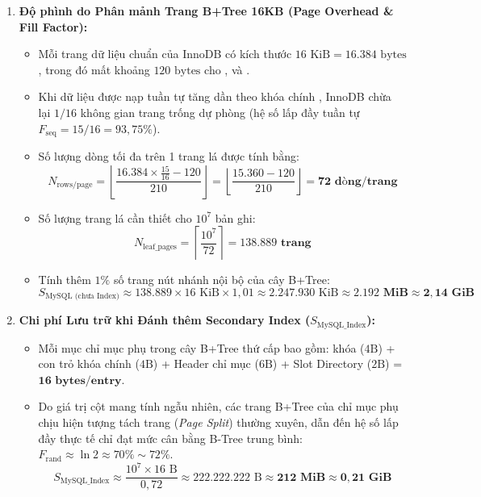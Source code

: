 \begin{enumerate}
  \item \textbf{Độ phình do Phân mảnh Trang B+Tree 16KB (Page Overhead \& Fill Factor):}
  \begin{itemize}
    \item Mỗi trang dữ liệu chuẩn của InnoDB có kích thước $16\text{ KiB} = 16.384\text{ bytes}$, trong đó mất khoảng $120\text{ bytes}$ cho ,  và .
    \item Khi dữ liệu được nạp tuần tự tăng dần theo khóa chính , InnoDB chừa lại $1/16$ không gian trang trống dự phòng (hệ số lấp đầy tuần tự $F_{\text{seq}} = 15/16 = 93,75\%$).
    \item Số lượng dòng tối đa trên 1 trang lá được tính bằng:
    \begin{equation}
      N_{\text{rows/page}} = \left\lfloor \frac{16.384 \times \frac{15}{16} - 120}{210} \right\rfloor = \left\lfloor \frac{15.360 - 120}{210} \right\rfloor = \mathbf{72\text{ dòng/trang}}
    \end{equation}
    \item Số lượng trang lá cần thiết cho $10^7$ bản ghi:
    \begin{equation}
      N_{\text{leaf\_pages}} = \left\lceil \frac{10^7}{72} \right\rceil = \mathbf{138.889\text{ trang}}
    \end{equation}
    \item Tính thêm $1\%$ số trang nút nhánh nội bộ của cây B+Tree:
    \begin{equation}
      S_{\text{MySQL (chưa Index)}} \approx 138.889 \times 16\text{ KiB} \times 1,01 \approx 2.247.930\text{ KiB} \approx \mathbf{2.192\text{ MiB} \approx 2,14\text{ GiB}}
    \end{equation}
  \end{itemize}

  \item \textbf{Chi phí Lưu trữ khi Đánh thêm Secondary Index  ($S_{\text{MySQL\_Index}}$):}
  \begin{itemize}
    \item Mỗi mục chỉ mục phụ trong cây B+Tree thứ cấp bao gồm: khóa  ($4\text{B}$) + con trỏ khóa chính  ($4\text{B}$) + Header chỉ mục ($6\text{B}$) + Slot Directory ($2\text{B}$) = $\mathbf{16\text{ bytes/entry}}$.
    \item Do giá trị cột  mang tính ngẫu nhiên, các trang B+Tree của chỉ mục phụ chịu hiện tượng tách trang (\textit{Page Split}) thường xuyên, dẫn đến hệ số lấp đầy thực tế chỉ đạt mức cân bằng B-Tree trung bình: $F_{\text{rand}} \approx \ln 2 \approx 70\% \sim 72\%$.
    \begin{equation}
      S_{\text{MySQL\_Index}} \approx \frac{10^7 \times 16\text{ B}}{0,72} \approx 222.222.222\text{ B} \approx \mathbf{212\text{ MiB} \approx 0,21\text{ GiB}}
    \end{equation}
  \end{itemize}


\end{enumerate}
